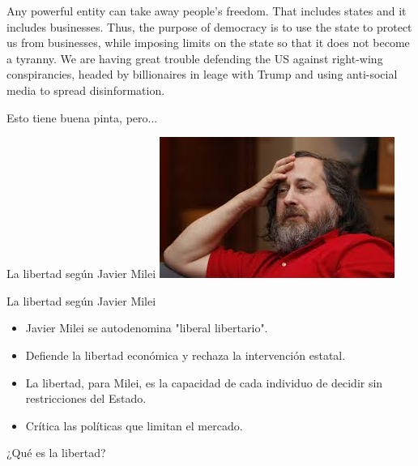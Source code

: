 \documentclass{beamer}
\begin{document}
\begin{frame}
  Any powerful entity can take away people's freedom. That includes states and
  it includes businesses. Thus, the purpose of democracy is to use the state to
  protect us from businesses, while imposing limits on the state so that it does
  not become a tyranny.
  \vfill
  We are having great trouble defending the US against right-wing
  conspirancies, headed by billionaires in leage with Trump and using
  anti-social media to spread disinformation.
\end{frame}

\begin{frame}
  \centering
  \Huge Esto tiene buena pinta, pero...
\end{frame}

\begin{frame}{La libertad según Javier Milei}
  \includegraphics[width=\linewidth]{images/uyy.jpeg}
\end{frame}

\begin{frame}{La libertad según Javier Milei}
    \begin{itemize}
        \item Javier Milei se autodenomina "liberal libertario". \pause
        \item Defiende la libertad económica y rechaza la intervención estatal. \pause
        \item La libertad, para Milei, es la capacidad de cada individuo de
          decidir sin restricciones del Estado. \pause
        \item Crítica las políticas que limitan el mercado.
    \end{itemize}
\end{frame}

\begin{frame}
    \centering
    \Huge ¿Qué es la libertad?
\end{frame}
\end{document}

